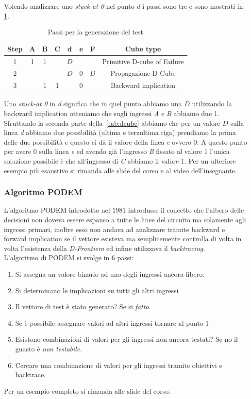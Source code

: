 Volendo analizzare uno \emph{stuck-at 0} nel punto \emph{d} i passi sono tre e sono mostrati in \tablename\,\ref{tab:dalgoexe}.\\
\begin{table}
\centering
\begin{tabular}{|c|cccccc|c|}
\hline
\textbf{Step} & \textbf{A} & \textbf{B} & \textbf{C} & \textbf{d} & \textbf{e} & \textbf{F} & \textbf{Cube type}\\
\hline
1 & 1 & 1 &   & $D$ &   &   & Primitive D-cube of Failure \\
\hline
2 &   &   &   & $D$ & 0 & $\overline{D}$ & Propagazione D-Cube \\
\hline
3 &   & 1 & 1 &   & 0 &   & Backward implication \\
\hline
\end{tabular}
\caption{Passi per la generazione del test}\label{tab:dalgoexe}
\end{table}
Uno \emph{stuck-at 0} in \emph{d} significa che in quel punto abbiamo una $D$ utilizzando la backward implication otteniamo che sugli ingressi \emph{A} e \emph{B} abbiamo due 1. Sfruttando la seconda parte della \tablename\,\ref{tab:dcube} abbiamo che per un valore $D$ sulla linea \emph{d} abbiamo due possibilità (ultima e terzultima riga) prendiamo la prima delle due possibilità e questo ci dà il valore della linea \emph{e} ovvero 0. A questo punto per avere 0 sulla linea \emph{e} ed avendo già l'ingresso \emph{B} fissato al valore 1 l'unica soluzione possibile è che all'ingresso di \emph{C} abbiamo il valore 1.
Per un ulteriore esempio più esaustivo si rimanda alle slide del corso e al video dell'insegnante.
\newpage
\subsubsection{Algoritmo PODEM}
L'algoritmo PODEM introdotto nel 1981 introdusse il concetto che l'albero delle decisioni non doveva essere espanso a tutte le linee del circuito ma solamente agli ingressi primari, inoltre esso non andava ad analizzare tramite backward e forward implication se il vettore esisteva ma semplicemente controlla di volta in volta l'esistenza della \emph{D-Frontiera} ed infine utilizzava il \emph{backtracing}.\\
L'algoritmo di PODEM si svolge in 6 passi:
\begin{enumerate}
\item Si assegna un valore binario ad uno degli ingressi ancora libero.
\item Si determinano le implicazioni su tutti gli altri ingressi
\item Il vettore di test è stato generato? Se si \emph{fatto}.
\item Se è possibile assegnare valori ad altri ingressi tornare al punto 1
\item Esistono combinazioni di valori per gli ingressi non ancora testati? Se no il guasto è \emph{non testabile.}
\item Cercare una combinazione di valori per gli ingressi tramite obiettivi e backtrace.
\end{enumerate}
Per un esempio completo si rimanda alle slide del corso.
